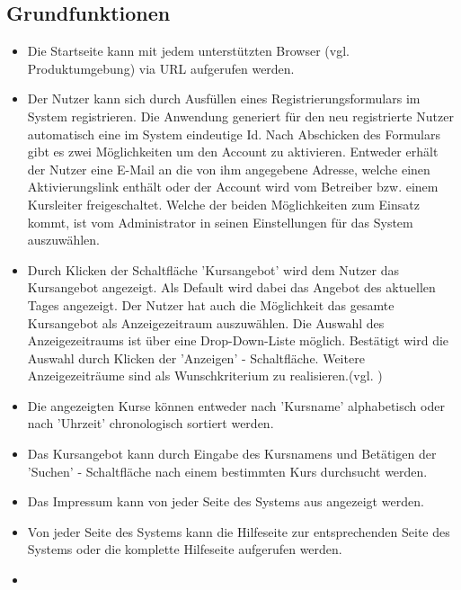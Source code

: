 \documentclass[a4paper]{scrreprt}
\begin{document}
		\subsection{Grundfunktionen}
			\begin{itemize}
				\item {}
					Die Startseite kann mit jedem unterstützten \gls{Browser} (vgl. Produktumgebung) via \gls{URL} aufgerufen werden.
				\item {}
					Der Nutzer kann sich durch Ausfüllen eines Registrierungsformulars im System registrieren. Die Anwendung generiert für den neu registrierte Nutzer automatisch eine im System eindeutige \gls{Id}. Nach Abschicken des Formulars gibt es zwei Möglichkeiten um den Account zu aktivieren. Entweder erhält der Nutzer eine E-Mail an die von ihm angegebene Adresse, welche einen Aktivierungslink enthält oder der Account wird vom Betreiber bzw. einem Kursleiter freigeschaltet. Welche der beiden Möglichkeiten zum Einsatz kommt, ist vom Administrator in seinen Einstellungen für das System auszuwählen.
				\item {}
					Durch Klicken der Schaltfläche 'Kursangebot' wird dem Nutzer das Kursangebot angezeigt. Als \gls{Default} wird dabei das Angebot des aktuellen Tages angezeigt. Der Nutzer hat auch die Möglichkeit das gesamte Kursangebot als Anzeigezeitraum auszuwählen. Die Auswahl des Anzeigezeitraums ist über eine Drop-Down-Liste möglich. Bestätigt wird die Auswahl durch Klicken der 'Anzeigen' - Schaltfläche. 
					Weitere Anzeigezeiträume sind als Wunschkriterium zu realisieren.(vgl. )
				\item {}
					Die angezeigten Kurse können entweder nach 'Kursname' alphabetisch oder nach 'Uhrzeit' chronologisch sortiert werden.
				\item {}
					Das Kursangebot kann durch Eingabe des Kursnamens  und Betätigen der 'Suchen' - Schaltfläche nach einem bestimmten Kurs durchsucht werden.
				\item {}
					Das Impressum kann von jeder Seite des Systems aus angezeigt werden.
				\item {}
					Von jeder Seite des Systems kann die Hilfeseite zur entsprechenden Seite des Systems oder die komplette Hilfeseite aufgerufen werden.
				\item {}

\end{itemize}
\end{document}
